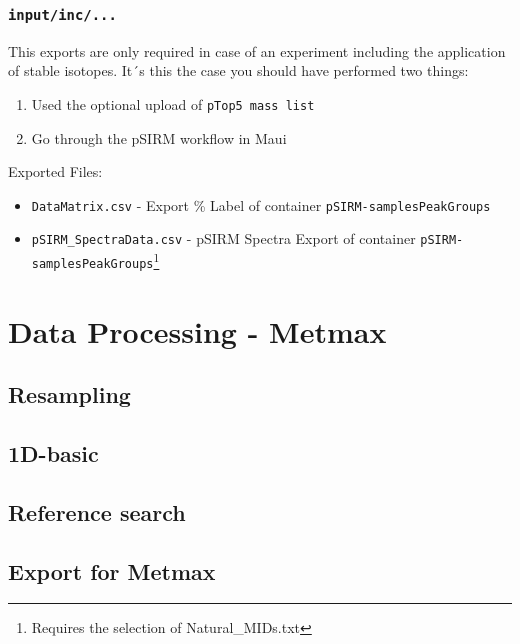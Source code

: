 \documentclass[]{book}
\providecommand{\tightlist}{%
  \setlength{\itemsep}{0pt}\setlength{\parskip}{0pt}}
\let\rmarkdownfootnote\footnote%
\def\footnote{\protect\rmarkdownfootnote}
\begin{document}
\subsection{\texorpdfstring{\texttt{input/inc/...}}{input/inc/...}}\label{inputinc...}

This exports are only required in case of an experiment including the
application of stable isotopes. It´s this the case you should have
performed two things:

\begin{enumerate}
\def\labelenumi{\arabic{enumi}.}
\tightlist
\item
  Used the optional upload of \texttt{pTop5\ mass\ list}
\item
  Go through the pSIRM workflow in Maui
\end{enumerate}

Exported Files:

\begin{itemize}
\tightlist
\item
  \texttt{DataMatrix.csv} - Export \% Label of container
  \texttt{pSIRM-samplesPeakGroups}
\item
  \texttt{pSIRM\_SpectraData.csv} - pSIRM Spectra Export of container
  \texttt{pSIRM-samplesPeakGroups}\footnote{Requires the selection of
    Natural\_MIDs.txt}
\end{itemize}

\chapter{Data Processing - Metmax}\label{metmaxexport}

\section{Resampling}\label{resampling-1}

\section{1D-basic}\label{d-basic}

\section{Reference search}\label{reference-search}

\section{Export for Metmax}\label{export-for-metmax}
\end{document}
